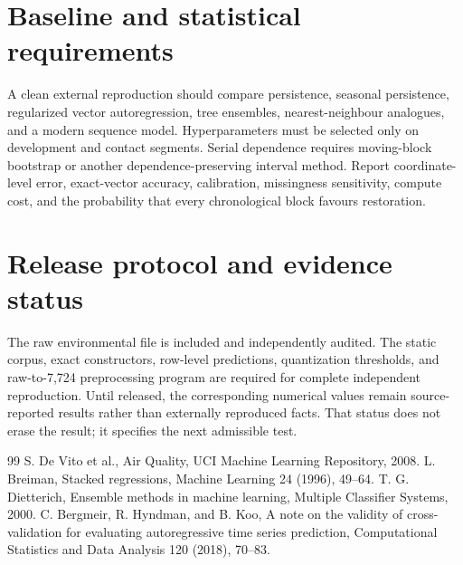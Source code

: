 \documentclass[11pt,a4paper]{article}
\begin{document}
\section{Baseline and statistical requirements}
A clean external reproduction should compare persistence, seasonal persistence, regularized vector autoregression, tree ensembles, nearest-neighbour analogues, and a modern sequence model. Hyperparameters must be selected only on development and contact segments. Serial dependence requires moving-block bootstrap or another dependence-preserving interval method. Report coordinate-level error, exact-vector accuracy, calibration, missingness sensitivity, compute cost, and the probability that every chronological block favours restoration.

\section{Release protocol and evidence status}
The raw environmental file is included and independently audited. The static corpus, exact constructors, row-level predictions, quantization thresholds, and raw-to-7,724 preprocessing program are required for complete independent reproduction. Until released, the corresponding numerical values remain source-reported results rather than externally reproduced facts. That status does not erase the result; it specifies the next admissible test.

\begin{thebibliography}{99}
 S. De Vito et al., Air Quality, UCI Machine Learning Repository, 2008.
 L. Breiman, Stacked regressions, Machine Learning 24 (1996), 49--64.
 T. G. Dietterich, Ensemble methods in machine learning, Multiple Classifier Systems, 2000.
 C. Bergmeir, R. Hyndman, and B. Koo, A note on the validity of cross-validation for evaluating autoregressive time series prediction, Computational Statistics and Data Analysis 120 (2018), 70--83.
\end{thebibliography}
\end{document}
